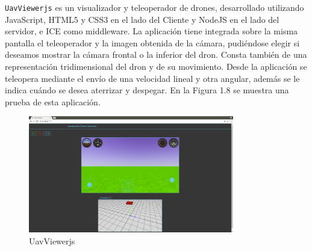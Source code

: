 \texttt{UavViewerjs} es un visualizador y teleoperador de drones, desarrollado utilizando JavaScript, HTML5 y CSS3 en el lado del Cliente y NodeJS en el lado del servidor, e ICE como middleware. La aplicación tiene integrada sobre la misma pantalla el teleoperador y la imagen obtenida de la cámara, pudiéndose elegir si deseamos mostrar la cámara frontal o la inferior del dron. Consta también de una representación tridimensional del dron y de su movimiento. Desde la aplicación se teleopera mediante el envío de una velocidad lineal y otra angular, además se le indica cuándo se desea aterrizar y despegar. En la Figura 1.8 se muestra una prueba de esta aplicación.

\begin{figure}[H]
  \begin{center}
    \includegraphics[width=0.8\textwidth]{figures/uavviewerjs.png}
		\caption{UavViewerjs}
		\label{fig.uavviewerjs}
		\end{center}
\end{figure}